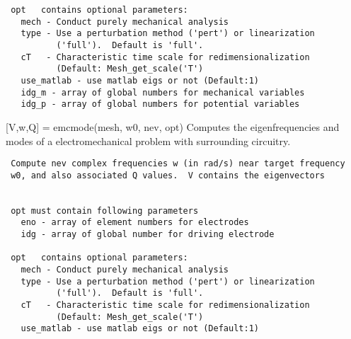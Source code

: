 \begin{codelist}
\begin{verbatim}
 opt   contains optional parameters:
   mech - Conduct purely mechanical analysis
   type - Use a perturbation method ('pert') or linearization
          ('full').  Default is 'full'.
   cT   - Characteristic time scale for redimensionalization
          (Default: Mesh_get_scale('T')
   use_matlab - use matlab eigs or not (Default:1)
   idg_m - array of global numbers for mechanical variables
   idg_p - array of global numbers for potential variables

\end{verbatim}

   \item[{[V,w,Q]} = emcmode(mesh, w0, nev, opt)]
   Computes the eigenfrequencies and modes of a electromechanical problem with 
   surrounding circuitry.
\begin{verbatim}
 Compute nev complex frequencies w (in rad/s) near target frequency
 w0, and also associated Q values.  V contains the eigenvectors


 opt must contain following parameters
   eno - array of element numbers for electrodes
   idg - array of global number for driving electrode

 opt   contains optional parameters:
   mech - Conduct purely mechanical analysis
   type - Use a perturbation method ('pert') or linearization
          ('full').  Default is 'full'.
   cT   - Characteristic time scale for redimensionalization
          (Default: Mesh_get_scale('T')
   use_matlab - use matlab eigs or not (Default:1)

\end{verbatim}

\end{codelist}

\clearpage
